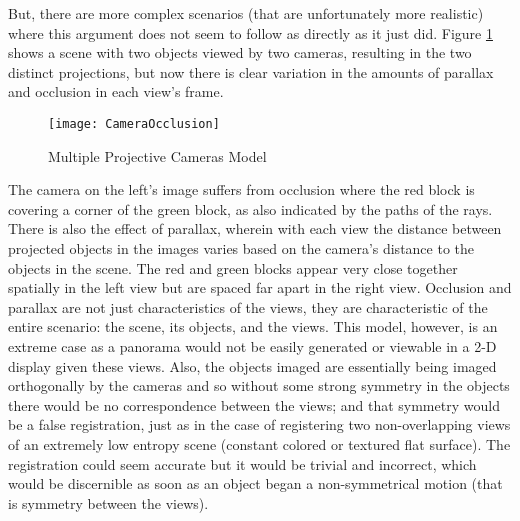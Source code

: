 But, there are more complex scenarios (that are unfortunately more realistic) where this argument does not seem to follow as directly as it just did. Figure \ref{CameraOcclusion} shows a scene with two objects viewed by two cameras, resulting in the two distinct projections, but now there is clear variation in the amounts of parallax and occlusion in each view's frame.


\begin{figure}[h]
\centering
\texttt{[image: CameraOcclusion]}
\caption{Multiple Projective Cameras Model}
\label{CameraOcclusion}
\end{figure}

\noindent The camera on the left's image suffers from occlusion where the red block is covering a corner of the green block, as also indicated by the paths of the rays. There is also the effect of parallax, wherein with each view the distance between projected objects in the images varies based on the camera's distance to the objects in the scene. The red and green blocks appear very close together spatially in the left view but are spaced far apart in the right view. Occlusion and parallax are not just characteristics of the views, they are characteristic of the entire scenario: the scene, its objects, and the views. This model, however, is an extreme case as a panorama would not be easily generated or viewable in a 2-D display given these views. Also, the objects imaged are essentially being imaged orthogonally by the cameras and so without some strong symmetry in the objects there would be no correspondence between the views; and that symmetry would be a false registration, just as in the case of registering two non-overlapping views of an extremely low entropy scene (constant colored or textured flat surface). The registration could seem accurate but it would be trivial and incorrect, which would be discernible as soon as an object began a non-symmetrical motion (that is symmetry between the views).

